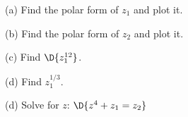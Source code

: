\documentclass[12pt]{amsart}
\numberwithin{equation}{section}
\begin{document}
(a) Find the polar form of $z_1$ and plot it.

\vspace{3.2cm}

(b) Find the polar form of $z_2$ and plot it.

\vspace{4.2cm}

(c) Find $\D{z_1^{12}}$.

\vspace{4.2cm}

(d) Find $z_1^{1/3}$.

\vspace{4.2cm}

(d) Solve for $z$: \quad $\D{z^4+z_1=z_2}$



 
\thispagestyle{empty}
\newpage
\thispagestyle{empty}
\end{document}
